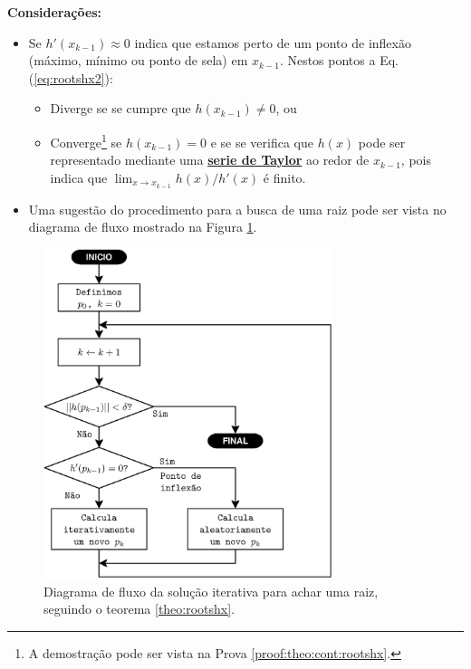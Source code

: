 \begin{theorem}
\textbf{Considerações:}
\begin{itemize} 
\item Se $h'(x_{k-1})\approx 0$ indica que estamos perto de um ponto de inflexão 
(máximo, mínimo ou ponto de sela) em $x_{k-1}$. Nestos pontos a Eq. (\ref{eq:rootshx2}): 
\begin{itemize}
\item Diverge se se cumpre que $h(x_{k-1})\neq 0$, ou
\item Converge\footnote{A demostração pode ser vista na Prova \ref{proof:theo:cont:rootshx}.} 
se $h(x_{k-1}) = 0$ e se se verifica que $h(x)$ pode ser representado 
mediante uma \hyperref[def:taylor]{\textbf{serie de Taylor}} ao redor de $x_{k-1}$, 
 pois indica que $\lim_{x\rightarrow x_{k-1}}  h(x)/h'(x)$ é finito.
\end{itemize}
\item Uma sugestão do procedimento para a busca de uma raiz pode ser vista no diagrama de fluxo
mostrado na Figura \ref{fig:fluxorhx1}. 
\end{itemize}
\end{theorem}

\begin{figure}[!h]
     \centering
         \includegraphics[width=0.75\textwidth]{chapters/roots/fluxo1.eps}
        \caption{Diagrama de fluxo da solução iterativa para achar uma raiz, seguindo o teorema \ref{theo:rootshx}.}
        \label{fig:fluxorhx1}
\end{figure}

